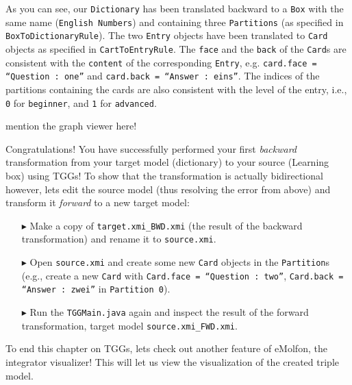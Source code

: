 As you can see, our \texttt{Dictionary} has been translated backward to a \texttt{Box} with the same name (\texttt{English Numbers}) and containing three
\texttt{Par\-ti\-tions} (as specified in \texttt{Box\-To\-Dictionary\-Rule}). The two \texttt{Entry} objects have been translated to \texttt{Card} objects as
specified in \texttt{CartToEntryRule}. The \texttt{face} and the \texttt{back} of the \texttt{Card}s are consistent with the \texttt{content}
of the corresponding \texttt{Entry}, e.g. \texttt{card.face = ``Question : one''} and \texttt{card.back = ``Answer : eins''}. The indices of the partitions
containing the cards are also consistent with the level of the entry, i.e., \texttt{0} for \texttt{beginner}, and \texttt{1} for \texttt{advanced}.

mention the graph viewer here!

\vspace{0.5cm}

Congratulations! You have successfully performed your first \emph{backward} transformation from your target model (dictionary) to your source (Learning box)
using TGGs! To show that the transformation is actually bidirectional however, lets edit the source model (thus resolving the error from above) and transform it
\emph{forward} to a new target model:

\begin{itemize}
\item[$\blacktriangleright$] Make a copy of \texttt{target.xmi\_BWD.xmi} (the result of the backward transformation)
and rename it to \texttt{source.xmi}.
  
\item[$\blacktriangleright$] Open \texttt{source.xmi} and create some new \texttt{Card} objects in the \texttt{Partition}s (e.g., create a new \texttt{Card}
with \texttt{Card.face = ``Question : two''}, \texttt{Card.back = ``Answer : zwei''} in \texttt{Partition 0}).

\item[$\blacktriangleright$] Run the \texttt{TGGMain.java} again and inspect the result of the forward transformation, target model
\texttt{source.xmi\_FWD.xmi}.

\end{itemize}


To end this chapter on TGGs, lets check out another feature of eMolfon, the integrator visualizer! This will let us view the visualization of the created
triple model.

\newpage

